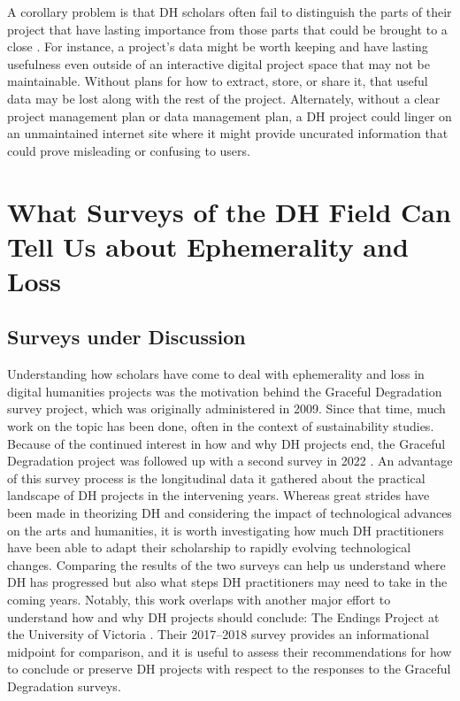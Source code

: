 \documentclass[final]{anthology-ch}
\begin{document}
A corollary problem is that DH scholars often fail to distinguish the parts of their project that have lasting importance from those parts that could be brought to a close \cite[p.~11]{wymer2021introduction}. For instance, a project's data might be worth keeping and have lasting usefulness even outside of an interactive digital project space that may not be maintainable. Without plans for how to extract, store, or share it, that useful data may be lost along with the rest of the project. Alternately, without a clear project management plan or data management plan, a DH project could linger on an unmaintained internet site where it might provide uncurated information that could prove misleading or confusing to users.

\section{What Surveys of the DH Field Can Tell Us about Ephemerality and Loss} \label{sec:surveys}

\subsection{Surveys under Discussion}

Understanding how scholars have come to deal with ephemerality and loss in digital humanities projects was the motivation behind the Graceful Degradation survey project, which was originally administered in 2009. Since that time, much work on the topic has been done, often in the context of sustainability studies. Because of the continued interest in how and why DH projects end, the Graceful Degradation project was followed up with a second survey in 2022 \cite{wymer2026graceful}. An advantage of this survey process is the longitudinal data it gathered about the practical landscape of DH projects in the intervening years. Whereas great strides have been made in theorizing DH and considering the impact of technological advances on the arts and humanities, it is worth investigating how much DH practitioners have been able to adapt their scholarship to rapidly evolving technological changes. Comparing the results of the two surveys can help us understand where DH has progressed but also what steps DH practitioners may need to take in the coming years. Notably, this work overlaps with another major effort to understand how and why DH projects should conclude: The Endings Project at the University of Victoria \cite{endings2024about, holmes2023tamagotchis}. Their 2017--2018 survey provides an informational midpoint for comparison, and it is useful to assess their recommendations for how to conclude or preserve DH projects \cite{goddard2023whats, endings2024principles} with respect to the responses to the Graceful Degradation surveys.
\end{document}
